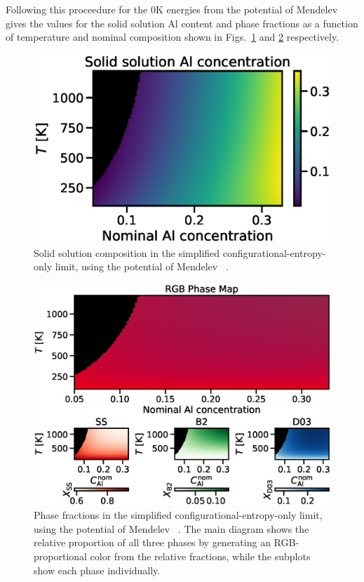 Following this proceedure for the 0K energies from the potential of Mendelev \etal~\cite{mendelev2005effect} gives the values for the solid solution Al content and phase fractions as a function of temperature and nominal composition shown in Figs.~\ref{fig:conf_concentration} and \ref{fig:conf_phase_fraction} respectively.
%
\begin{figure}[h]
    \label{fig:conf_concentration}
    \centering
    \includegraphics[width=\textwidth]{figures/conf_concentration}
    \caption{Solid solution composition in the simplified configurational-entropy-only limit, using the potential of Mendelev \etal~\cite{mendelev2005effect}. }
\end{figure}
%
\begin{figure}[h]
    \label{fig:conf_phase_fraction}
    \centering
    \includegraphics[width=\textwidth]{figures/conf_phase_fractions}
    \caption{Phase fractions in the simplified configurational-entropy-only limit, using the potential of Mendelev \etal~\cite{mendelev2005effect}. The main diagram shows the relative proportion of all three phases by generating an RGB-proportional color from the relative fractions, while the subplots show each phase individually. }
\end{figure}
